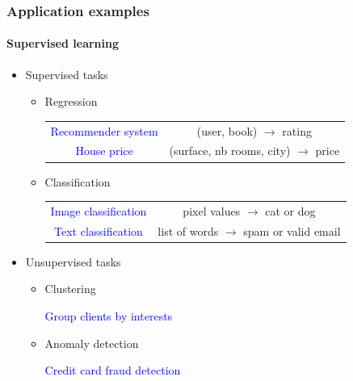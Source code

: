 \documentclass[9pt]{beamer}
\begin{document}
\begin{frame}

  \frametitle{Application examples}

  \framesubtitle{Supervised learning}

  \begin{itemize}
    \item Supervised tasks
      \begin{itemize}
      \item Regression

        \begin{center}
          \begin{tabular}{cc}
            \textcolor{blue}{Recommender system} & (user, book) $\to$ rating \\[0.2cm]
            \textcolor{blue}{House price} & (surface, nb rooms, city) $\to$ price \\[0.2cm]
        \end{tabular}
        \end{center}

      \item Classification

        \begin{center}
          \begin{tabular}{cc}
            \textcolor{blue}{Image classification} & pixel values $\to$ cat or dog \\[0.2cm]
            \textcolor{blue}{Text classification} & list of words $\to$ spam or valid email
          \end{tabular}
        \end{center}
      \end{itemize}
    \item Unsupervised tasks

      \begin{itemize}
        \item Clustering
          \begin{center}
            \textcolor{blue}{Group clients by interests} \\[.5cm]
          \end{center}
        \item Anomaly detection
          \begin{center}
            \textcolor{blue}{Credit card fraud detection}
          \end{center}
      \end{itemize}
  \end{itemize}

\end{frame}
\end{document}
